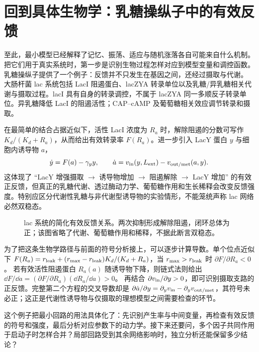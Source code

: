 \chapter{回到具体生物学：乳糖操纵子中的有效反馈}
至此，最小模型已经解释了记忆、振荡、适应与随机涨落各自可能来自什么机制。把它们用于真实系统时，第一步是识别生物过程怎样对应到模型变量和调控函数。乳糖操纵子提供了一个例子：反馈并不只发生在基因之间，还经过摄取与代谢。
大肠杆菌 lac 系统包括 LacI 阻遏蛋白、lacZYA 转录单位以及乳糖/异乳糖相关代谢与摄取过程。lacI 具有自身的转录调控，不属于 lacZYA 同一多顺反子转录单位。异乳糖降低 LacI 的阻遏活性；CAP--cAMP 及葡萄糖相关效应调节转录和摄取。

在最简单的结合占据近似下，活性 LacI 浓度为 $R_a$ 时，解除阻遏的分数可写作 $K_d/(K_d+R_a)$，从而给出有效转录率 $F(R_a)$。进一步引入 LacY 蛋白 $y$ 与细胞内诱导物 $a$，
\begin{equation}\dot y=F(a)-\gamma_y y,\qquad\dot a=v_{\rm in}(y,L_{\rm ext})-v_{\rm out/met}(a,y).\end{equation}
这体现了 ``LacY 增强摄取 $\to$ 诱导物增加 $\to$ 阻遏解除 $\to$ LacY 增加'' 的有效正反馈，但真正的乳糖代谢、透过酶动力学、葡萄糖作用和生长稀释会改变反馈强度。特别应区分代谢性乳糖与非代谢型诱导物的实验情形，不能笼统声称 lac 网络必然双稳态。

\begin{figure}[H]\centering
{}
\caption{lac 系统的简化有效反馈关系。两次抑制形成解除阻遏，闭环总体为正；该图省略了代谢、葡萄糖作用和稀释，不据此断言双稳态。}
\end{figure}

为了把这条生物学路径与前面的符号分析接上，可以逐步计算导数。单个位点近似下 $F(R_a)=r_{\rm leak}+(r_{\rm max}-r_{\rm leak})K_d/(K_d+R_a)$，当 $r_{\rm max}>r_{\rm leak}$ 时 $\partial F/\partial R_a<0$。
若有效活性阻遏蛋白 $R_a(a)$ 随诱导物下降，则链式法则给出 $\dd F/\dd a=(\partial F/\partial R_a)(\dd R_a/\dd a)>0$。
再结合 $\partial v_{\rm in}/\partial y>0$，即可识别摄取支路的正反馈。完整第二个方程的交叉导数却是
$\partial\dot a/\partial y=\partial_yv_{\rm in}-\partial_yv_{\rm out/met}$，其符号未必正；这正是代谢性诱导物与仅摄取的理想模型之间需要检查的环节。

这个例子把最小回路的用法具体化了：先识别产生率与中间变量，再检查有效反馈的符号和强度，最后分析对应参数下的动力学。接下来还要问，多个因子共同作用于启动子时怎样合并？局部回路受到其余网络影响时，独立分析还能保留多少结论？
